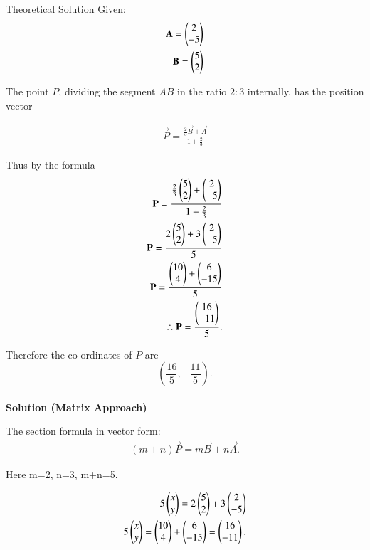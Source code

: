 \documentclass{beamer}
\begin{document}
	\begin{frame}{Theoretical Solution}
    Given:
\begin{align}
\mathbf{A} = \begin{pmatrix}2 \\ -5\end{pmatrix} \\ \mathbf{B} = \begin{pmatrix}5 \\ 2\end{pmatrix}
\end{align}

The point \(P\), dividing the segment \(AB\) in the ratio \(2:3\) internally, has the position vector

\begin{align}
    \vec{P} = \frac{\frac{2}{3} \vec{B} + \vec{A}}{1 + \frac{2}{3}} 
\end{align}
\end{frame}
\begin{frame}

Thus by the formula \\
\begin{align} 
\mathbf{P}=\frac{\frac{2}{3}\begin{pmatrix}5 \\ 2\end{pmatrix}+\begin{pmatrix}2\\-5\end{pmatrix}}{1+\frac{2}{3}}\\
	\mathbf{P}= \frac{2 \begin{pmatrix}5 \\ 2\end{pmatrix} + 3\begin{pmatrix}2 \\ -5\end{pmatrix}}{5} \\ \mathbf{P}= \frac{\begin{pmatrix}10 \\ 4\end{pmatrix} + \begin{pmatrix}6 \\ -15\end{pmatrix}}{5} \\  \therefore \mathbf{P}= \frac{\begin{pmatrix}16 \\ -11\end{pmatrix}}{5}.
\end{align}
\end{frame}
\begin{frame}
Therefore the co-ordinates of \(P\) are \[
\left(\dfrac{16}{5}, -\dfrac{11}{5}\right).
\]
\\
\textbf{Solution (Matrix Approach)}

The section formula in vector form:
\begin{align*}
(m+n)\vec{P} = m\vec{B} + n\vec{A}.
\end{align*}


Here  m=2, n=3, m+n=5. 

\begin{align}
5\begin{pmatrix}x\\y\end{pmatrix} = 2\begin{pmatrix}5\\2\end{pmatrix} + 3\begin{pmatrix}2\\-5\end{pmatrix} \\
5\begin{pmatrix}x\\y\end{pmatrix}= \begin{pmatrix}10\\4\end{pmatrix} + \begin{pmatrix}6\\-15\end{pmatrix} = \begin{pmatrix}16\\-11\end{pmatrix}.
\end{align}
\end{frame}
\end{document}
